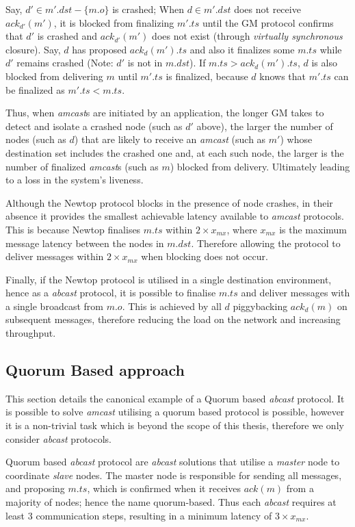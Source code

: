         Say, $d' \in m'.dst - \{m.o\}$ is crashed; When $d \in m'.dst$ does not receive $ack_{d'}(m')$, it is blocked from finalizing $m'.ts$ until the GM protocol confirms that $d'$ is crashed and $ack_{d'}(m')$ does not exist (through \emph{virtually synchronous} closure). Say, $d$ has proposed $ack_d(m').ts$ and also it finalizes some $m.ts$ while $d'$ remains crashed (Note: $d'$ is not in $m.dst$). If $m.ts > ack_d(m').ts$, $d$ is also blocked from delivering $m$ until $m'.ts$ is finalized, because $d$ knows that $m'.ts$ can be finalized as $m'.ts < m.ts$.

Thus, when \emph{amcast}s are initiated by an application, the longer GM takes to detect and isolate a crashed node (such as $d'$ above), the larger the number of nodes (such as $d$) that are likely to receive an \emph{amcast} (such as $m'$) whose destination set includes the crashed one and, at each such node, the larger is the number of finalized \emph{amcast}s (such as $m$) blocked from delivery.  Ultimately leading to a loss in the system's liveness.  

Although the Newtop protocol blocks in the presence of node crashes, in their absence it provides the smallest achievable latency available to \emph{amcast} protocols.  This is because Newtop finalises $m.ts$ within $2 \times x_{mx}$, where $x_{mx}$ is the maximum message latency between the nodes in $m.dst$.  Therefore allowing the protocol to deliver messages within $2 \times x_{mx}$ when blocking does not occur.  

Finally, if the Newtop protocol is utilised in a single destination environment, hence as a \emph{abcast} protocol, it is possible to finalise $m.ts$ and deliver messages with a single broadcast from $m.o$.  This is achieved by all $d$ piggybacking $ack_d(m)$ on subsequent messages, therefore reducing the load on the network and increasing throughput.  

	\subsection{Quorum Based approach}
	 This section details the canonical example of a Quorum based \emph{abcast} protocol. It is possible to solve \emph{amcast} utilising a quorum based protocol is possible, however it is a non-trivial task which is beyond the scope of this thesis, therefore we only consider \emph{abcast} protocols.  
	 
	Quorum based \emph{abcast} protocol are \emph{abcast} solutions that utilise a \emph{master} node to coordinate \emph{slave} nodes.  The master node is responsible for sending all messages, and proposing $m.ts$, which is confirmed when it receives $ack(m)$ from a majority of nodes; hence the name quorum-based.  Thus each \emph{abcast} requires at least 3 communication steps, resulting in a minimum latency of $3 \times x_{mx}$.  
	
